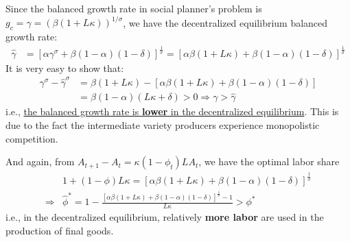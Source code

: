 \documentclass[10pt,landscape,a4paper]{article}
\begin{document}
\begin{multicols*}{3}
Since the balanced growth rate in social planner's problem is $g_c = \gamma = \left(\beta(1+L\kappa)\right)^{1/\sigma}$, we have the decentralized equilibrium balanced growth rate:
\begin{align*}
    \hat{\gamma} &= \left[ \alpha \gamma^{\sigma} +\beta(1-\alpha)(1-\delta) \right]^{\frac{1}{\sigma}} = \left[ \alpha \beta(1+L\kappa) +\beta(1-\alpha)(1-\delta) \right]^{\frac{1}{\sigma}}
\end{align*}
It is very easy to show that:
\begin{align*}
    \gamma^{\sigma} -\hat{\gamma}^{\sigma} &= \beta(1+L\kappa) - \left[ \alpha \beta(1+L\kappa) +\beta(1-\alpha)(1-\delta) \right]\\
    & = \beta(1-\alpha)(L\kappa + \delta) >0 \Rightarrow \gamma>\hat{\gamma}
\end{align*}
i.e., \underline{the balanced growth rate is \textbf{lower} in the decentralized equilibrium}. This is due to the fact the intermediate variety producers experience monopolistic competition.

\vspace{2pt}
And again, from $A_{t+1}-A_t = \kappa(1-\phi_t)LA_t$, we have the optimal labor share
\begin{align*}
    & 1+(1-\phi)L\kappa = \left[ \alpha \beta(1+L\kappa) +\beta(1-\alpha)(1-\delta) \right]^{\frac{1}{\sigma}}\\
    \Rightarrow & \hat{\phi}^* =1- \frac{\left[ \alpha \beta(1+L\kappa) +\beta(1-\alpha)(1-\delta) \right]^{\frac{1}{\sigma}}-1}{L\kappa} >\phi^*
\end{align*}
i.e., in the decentralized equilibrium, relatively \textbf{more labor} are used in the production of final goods.

\vspace{2pt}


\end{multicols*}
\end{document}
